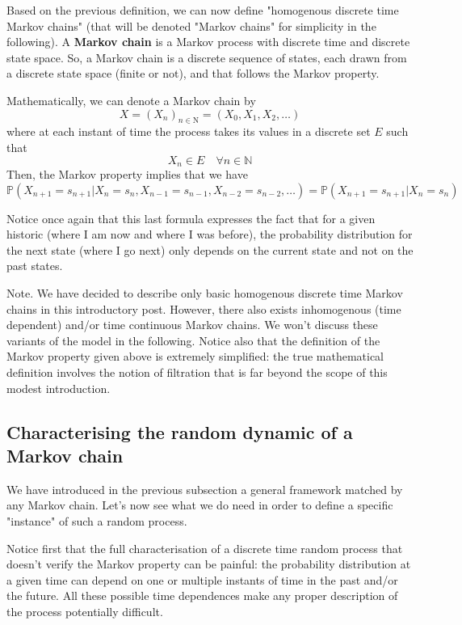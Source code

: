 Based on the previous definition, we can now define "homogenous discrete time Markov chains" (that will be denoted "Markov chains" for simplicity in the following). A \textbf{Markov chain} is a Markov process with discrete time and discrete state space. So, a Markov chain is a discrete sequence of states, each drawn from a discrete state space (finite or not), and that follows the Markov property.

Mathematically, we can denote a Markov chain by
\begin{equation}X=\left(X_{n}\right)_{n \in \mathrm{N}}=\left(X_{0}, X_{1}, X_{2}, \ldots\right)\end{equation}
where at each instant of time the process takes its values in a discrete set $E$ such that
\begin{equation}X_{n} \in E \quad \forall n \in \mathbb{N}\end{equation}
Then, the Markov property implies that we have
\begin{equation}
\mathbb{P}\left(X_{n+1}=s_{n+1} | X_{n}=s_{n}, X_{n-1}=s_{n-1}, X_{n-2}=s_{n-2}, \ldots\right)=\mathbb{P}\left(X_{n+1}=s_{n+1} | X_{n}=s_{n}\right)
\end{equation}

Notice once again that this last formula expresses the fact that for a given historic (where I am now and where I was before), the probability distribution for the next state (where I go next) only depends on the current state and not on the past states.

Note. We have decided to describe only basic homogenous discrete time Markov chains in this introductory post. However, there also exists inhomogenous (time dependent) and/or time continuous Markov chains. We won't discuss these variants of the model in the following. Notice also that the definition of the Markov property given above is extremely simplified: the true mathematical definition involves the notion of filtration that is far beyond the scope of this modest introduction.

\subsection{Characterising the random dynamic of a Markov chain}

We have introduced in the previous subsection a general framework matched by any Markov chain. Let's now see what we do need in order to define a specific "instance" of such a random process.

Notice first that the full characterisation of a discrete time random process that doesn't verify the Markov property can be painful: the probability distribution at a given time can depend on one or multiple instants of time in the past and/or the future. All these possible time dependences make any proper description of the process potentially difficult.

